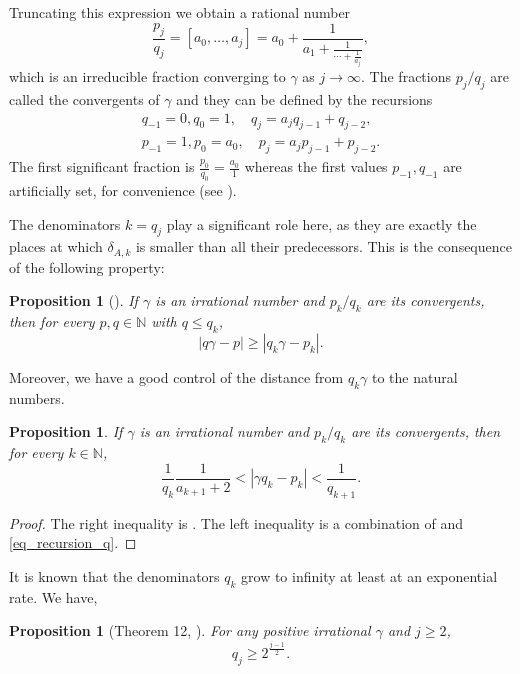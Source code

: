 \documentclass{amsart}
\def \N{\mathbb N}
\newtheorem{proposition}[theorem]{Proposition}
\begin{document}
Truncating this expression we obtain a rational number
\[ \frac{p_j}{q_j} = [a_0, \ldots, a_j] = a_0 + \frac 1{a_1 + \frac 1{ \cdots + \frac 1{a_j} } }, \]
which is an irreducible fraction converging to $\gamma$ as $j \to \infty$.
The fractions $p_j/q_j$ are called the convergents of $\gamma$ and they can be defined by the recursions
\begin{align}
	q_{-1} = 0, q_0 = 1, \quad q_j = a_j q_{j-1} + q_{j-2},	\label{eq_recursion_q} \\
	p_{-1} = 1, p_0 = a_0, \quad p_j = a_j p_{j-1} + p_{j-2}. \label{eq_recursion_p}
\end{align}
The first significant fraction is $\frac {p_0}{q_0} = \frac {a_0}1$ whereas the first values $p_{-1}, q_{-1}$ are artificially set, for convenience (see \cite[equation (7)]{khinchin1964continued}).

The denominators $k = q_j$ play a significant role here, as they are exactly the places at which $\delta_{A,k}$ is smaller than all their predecessors.
This is the consequence of the following property:
\begin{proposition}[{\cite[Theorem 17]{khinchin1964continued}}]
	\label{prop_bestapprox}
	If $\gamma$ is an irrational number and $p_k/q_k$ are its convergents, then for every $p,q \in \N$ with $q \leq q_k$,
	\[|q \gamma - p| \geq |q_k \gamma - p_k|.\]
\end{proposition}

Moreover, we have a good control of the distance from $q_k \gamma$ to the natural numbers.
\begin{proposition}
	\label{prop_estimate}
	If $\gamma$ is an irrational number and $p_k/q_k$ are its convergents, then for every $k \in \N$,
	\[ \frac 1{q_k} \frac 1{a_{k+1} +2} < |\gamma q_k - p_k| < \frac 1{q_{k+1}}.\] 
\end{proposition}
\begin{proof}
	The right inequality is \cite[Theorem 9]{khinchin1964continued}.
	The left inequality is a combination of \cite[Theorem 13]{khinchin1964continued} and \eqref{eq_recursion_q}.
\end{proof}

It is known that the denominators $q_k$ grow to infinity at least at an exponential rate. We have,
\begin{proposition}[{Theorem 12, \cite{khinchin1964continued}}]
	\label{prop_expgrowth}
	For any positive irrational $\gamma$ and $j \geq 2$,
	\[q_j \geq 2^{\frac{j-1}2}.\]
\end{proposition}
\end{document}
